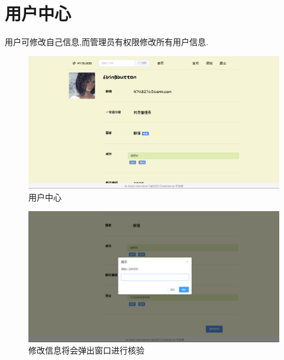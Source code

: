 \section{用户中心}

用户可修改自己信息,而管理员有权限修改所有用户信息.
\begin{figure}[thbp!]
	\centering
	\includegraphics[scale=0.35]{figure/user}
	\caption{用户中心}
\end{figure}

\begin{figure}[thbp!]
	\centering
	\includegraphics[scale=0.35]{figure/passwd}
	\caption{修改信息将会弹出窗口进行核验}
\end{figure}